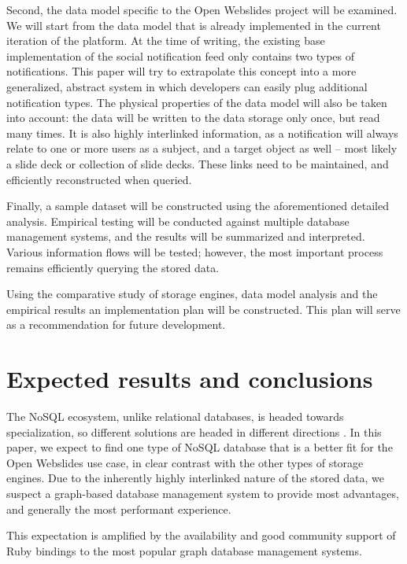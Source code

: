 \documentclass[fleqn,10pt]{voorstel}
\begin{document}
Second, the data model specific to the Open Webslides project will be examined. We will start from the data model that is already implemented in the current iteration of the platform. At the time of writing, the existing base implementation of the social notification feed only contains two types of notifications. This paper will try to extrapolate this concept into a more generalized, abstract system in which developers can easily plug additional notification types.
The physical properties of the data model will also be taken into account: the data will be written to the data storage only once, but read many times. It is also highly interlinked information, as a notification will always relate to one or more users as a subject, and a target object as well -- most likely a slide deck or collection of slide decks. These links need to be maintained, and efficiently reconstructed when queried.

Finally, a sample dataset will be constructed using the aforementioned detailed analysis. Empirical testing will be conducted against multiple database management systems, and the results will be summarized and interpreted. Various information flows will be tested; however, the most important process remains efficiently querying the stored data.

Using the comparative study of storage engines, data model analysis and the empirical results an implementation plan will be constructed. This plan will serve as a recommendation for future development.

\section{Expected results and conclusions}
\label{sec:expected_results_and_conclusions}

The NoSQL ecosystem, unlike relational databases, is headed towards specialization, so different solutions are headed in different directions \autocite{Maroo2013}. In this paper, we expect to find one type of NoSQL database that is a better fit for the Open Webslides use case, in clear contrast with the other types of storage engines. Due to the inherently highly interlinked nature of the stored data, we suspect a graph-based database management system to provide most advantages, and generally the most performant experience.

This expectation is amplified by the availability and good community support of Ruby bindings to the most popular graph database management systems.
\end{document}

